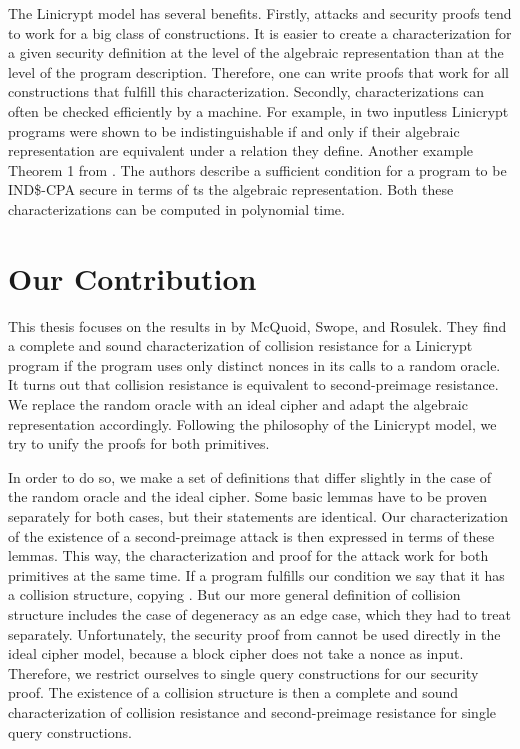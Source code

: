 The Linicrypt model has several benefits.
Firstly, attacks and security proofs tend to work for a big class of constructions.
It is easier to create a characterization for a given security definition at the level of the algebraic representation than at the level of the program description. 
Therefore, one can write proofs that work for all constructions that fulfill this characterization.
Secondly, characterizations can often be checked efficiently by a machine.
For example, in \cite{C:CarRos16} two inputless Linicrypt programs were shown to be indistinguishable if and only if their algebraic representation are equivalent under a relation they define.
Another example Theorem 1 from \cite{EPRINT:HolRosRoy22}.
The authors describe a sufficient condition for a program to be IND\$-CPA secure in terms of ts the algebraic representation.
Both these characterizations can be computed in polynomial time.

\section{Our Contribution}

This thesis focuses on the results in \cite{TCC:McQSwoRos19} by McQuoid, Swope, and Rosulek.
They find a complete and sound characterization of collision resistance for a Linicrypt program
if the program uses only distinct nonces in its calls to a random oracle.
It turns out that collision resistance is equivalent to second-preimage resistance.
We replace the random oracle with an ideal cipher and adapt the algebraic representation accordingly.
Following the philosophy of the Linicrypt model,
we try to unify the proofs for both primitives.



In order to do so, we make a set of definitions that differ slightly in the case of the random oracle and the ideal cipher.
Some basic lemmas have to be proven separately for both cases, but their statements are identical.
Our characterization of the existence of a second-preimage attack is then expressed in terms of these lemmas.
This way, the characterization and proof for the attack work for both primitives at the same time.
If a program fulfills our condition we say that it has a collision structure, copying \cite{TCC:McQSwoRos19}.
But our more general definition of collision structure includes the case of degeneracy as an edge case,
which they had to treat separately.
Unfortunately, the security proof from \cite{TCC:McQSwoRos19} cannot be used directly in the ideal cipher model,
because a block cipher does not take a nonce as input.
Therefore, we restrict ourselves to single query constructions for our security proof.
The existence of a collision structure is then a complete and sound characterization of collision resistance and second-preimage resistance for single query constructions.

